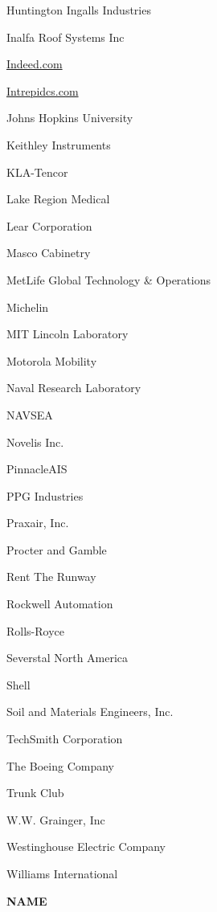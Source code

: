 \documentclass[twoside]{article}
\begin{document}
\begin{center}
\begin{multicols}{5}
\begin{FlushLeft}
\begin{compactitem}
\item Huntington Ingalls Industries
\item Inalfa Roof Systems Inc
\item \url{Indeed.com}
\item \url{Intrepidcs.com}
\item Johns Hopkins University
\item Keithley Instruments
\item KLA-Tencor
\item Lake Region Medical
\item Lear Corporation
\item Masco Cabinetry
\item MetLife Global Technology \& Operations
\item Michelin
\item MIT Lincoln Laboratory
\item Motorola Mobility
\item Naval Research Laboratory
\item NAVSEA
\item Novelis Inc.
\item PinnacleAIS
\item PPG Industries
\item Praxair, Inc.
\item Procter and Gamble
\item Rent The Runway
\item Rockwell Automation
\item Rolls-Royce
\item Severstal North America
\item Shell
\item Soil and Materials Engineers, Inc.
\item TechSmith Corporation
\item The Boeing Company
\item Trunk Club
\item W.W. Grainger, Inc
\item Westinghouse Electric Company
\item Williams International
\end{compactitem}
        \end{FlushLeft}
        \vspace{1em}
        {\fontsize{14}{16}\selectfont \bf NAME}\\
        \vspace{-1em}
        ~\hrulefill~
        \vspace{-.9em}
        \begin{FlushLeft}

\end{FlushLeft}
\end{multicols}
\end{center}
\end{document}
